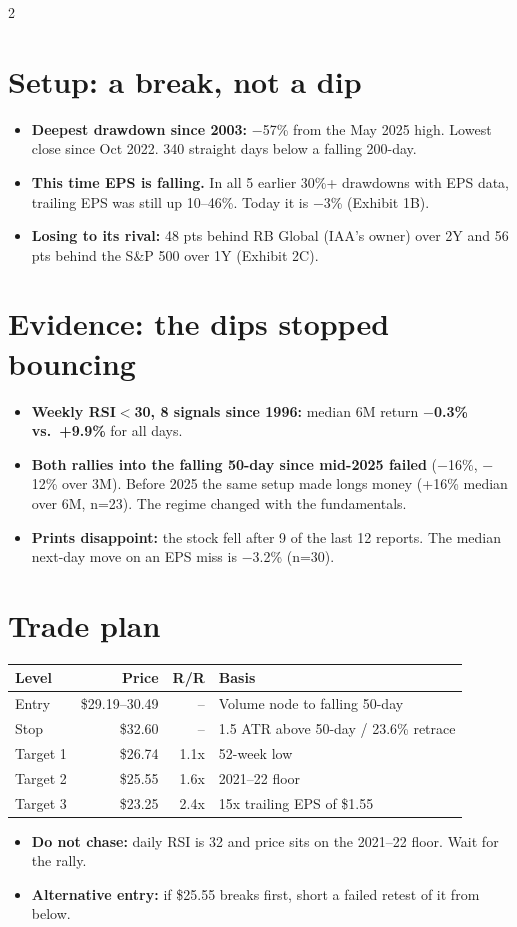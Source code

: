 \documentclass[10pt]{article}
\begin{document}
\begin{multicols}{2}
\section{Setup: a break, not a dip}
\begin{itemize}
  \item \textbf{Deepest drawdown since 2003:} $-$57\% from the May 2025 high. Lowest close since Oct 2022. 340 straight days below a falling 200-day.
  \item \textbf{This time EPS is falling.} In all 5 earlier 30\%+ drawdowns with EPS data, trailing EPS was still up 10--46\%. Today it is $-$3\% (Exhibit 1B).
  \item \textbf{Losing to its rival:} 48 pts behind RB Global (IAA's owner) over 2Y and 56 pts behind the S\&P 500 over 1Y (Exhibit 2C).
\end{itemize}

\section{Evidence: the dips stopped bouncing}
\begin{itemize}
  \item \textbf{Weekly RSI$<$30, 8 signals since 1996:} median 6M return \textbf{$-$0.3\% vs.\ +9.9\%} for all days.
  \item \textbf{Both rallies into the falling 50-day since mid-2025 failed} ($-$16\%, $-$12\% over 3M). Before 2025 the same setup made longs money (+16\% median over 6M, n=23). The regime changed with the fundamentals.
  \item \textbf{Prints disappoint:} the stock fell after 9 of the last 12 reports. The median next-day move on an EPS miss is $-$3.2\% (n=30).
\end{itemize}

\section{Trade plan}
{\footnotesize
\begin{tabularx}{\linewidth}{@{}lrrX@{}}
\toprule
Level & Price & R/R & Basis \\
\midrule
Entry & \$29.19--30.49 & -- & Volume node to falling 50-day \\
Stop & \$32.60 & -- & 1.5 ATR above 50-day / 23.6\% retrace \\
Target 1 & \$26.74 & 1.1x & 52-week low \\
Target 2 & \$25.55 & 1.6x & 2021--22 floor \\
Target 3 & \$23.25 & 2.4x & 15x trailing EPS of \$1.55 \\
\bottomrule
\end{tabularx}}
\begin{itemize}
  \item \textbf{Do not chase:} daily RSI is 32 and price sits on the 2021--22 floor. Wait for the rally.
  \item \textbf{Alternative entry:} if \$25.55 breaks first, short a failed retest of it from below.
\end{itemize}


\end{multicols}
\end{document}
